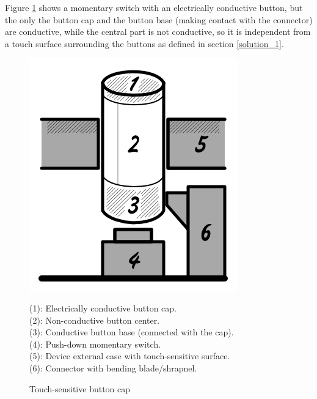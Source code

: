 \documentclass[10pt, twocolumn, a4paper]{article}
\begin{document}
    \pagebreak
    Figure \ref{fig_B2} shows a momentary switch with an electrically conductive button, but the only the button cap and the button base (making contact with the connector) are conductive, while the central part is not conductive, so it is independent from a touch surface surrounding the buttons as defined in section \ref{solution_1}.
    \begin{figure}[H]
        \begin{center}
            \includegraphics[width=0.4\linewidth]{figure_B2.png}
            \caption{Touch-sensitive button cap\\}
            \label{fig_B2}
            \small
                \vspace{2mm}
                (1): Electrically conductive button cap.\\
                (2): Non-conductive button center.\\
                (3): Conductive button base (connected with the cap).\\
                (4): Push-down momentary switch.\\
                (5): Device external case with touch-sensitive surface.\\
                (6): Connector with bending blade/shrapnel.
        \end{center}
    \end{figure}
\end{document}
